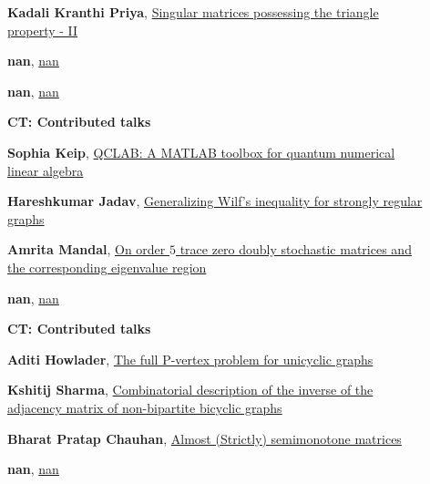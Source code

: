 \documentclass[ILAS2025-program.tex]{subfiles}
\begin{document}
\begin{description}
\begin{description}
        \item[] \hypertarget{up0085}{}\textbf{Kadali Kranthi Priya}, \hyperlink{down0085}{Singular matrices possessing the triangle property - II}
        \item[] \hypertarget{up0086}{}\textbf{nan}, \hyperlink{down0086}{nan}
        \item[] \hypertarget{up0087}{}\textbf{nan}, \hyperlink{down0087}{nan}
        \end{description}
    \begin{description}
    \item[] {\color{mstitle}\textbf{CT: Contributed talks}} 
    \item[] \hypertarget{up0088}{}\textbf{Sophia Keip}, \hyperlink{down0088}{QCLAB: A MATLAB toolbox for quantum numerical linear algebra}
        \item[] \hypertarget{up0089}{}\textbf{Hareshkumar Jadav}, \hyperlink{down0089}{Generalizing Wilf's inequality for strongly regular graphs}
        \item[] \hypertarget{up0090}{}\textbf{Amrita Mandal}, \hyperlink{down0090}{On order $5$ trace zero doubly stochastic matrices and the corresponding eigenvalue region}
        \item[] \hypertarget{up0091}{}\textbf{nan}, \hyperlink{down0091}{nan}
        \end{description}
    \begin{description}
    \item[] {\color{mstitle}\textbf{CT: Contributed talks}} 
    \item[] \hypertarget{up0092}{}\textbf{Aditi Howlader}, \hyperlink{down0092}{The full P-vertex problem for unicyclic graphs}
        \item[] \hypertarget{up0093}{}\textbf{Kshitij Sharma}, \hyperlink{down0093}{Combinatorial description of the inverse of the adjacency matrix of non-bipartite bicyclic graphs}
        \item[] \hypertarget{up0094}{}\textbf{Bharat Pratap Chauhan}, \hyperlink{down0094}{Almost (Strictly) semimonotone matrices}
        \item[] \hypertarget{up0095}{}\textbf{nan}, \hyperlink{down0095}{nan}
        \end{description}

\end{description}
\end{document}
